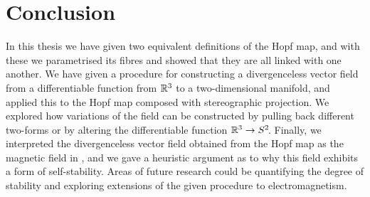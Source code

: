 
\chapter{Conclusion}
In this thesis we have given two equivalent definitions of the Hopf map,
and with these we parametrised its fibres and
showed that they are all linked with one another.
We have given a procedure for constructing a divergenceless vector field
from a differentiable function from $\mathbb{R}^3$ to a two-dimensional manifold,
and applied this to the Hopf map composed with stereographic projection.
We explored how variations of the field can be constructed
by pulling back different two-forms
or by altering the differentiable function $\mathbb{R}^3 \to S^2\!$.
Finally, we interpreted the divergenceless vector field
obtained from the Hopf map as the magnetic field in \mhd,
and we gave a heuristic argument as to why this field exhibits a form of self-stability.
Areas of future research could be quantifying the degree of stability
and exploring extensions of the given procedure to electromagnetism.
